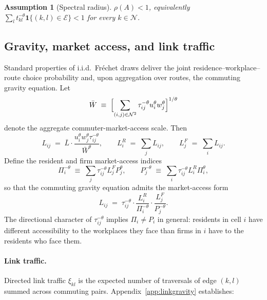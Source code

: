 \documentclass[12pt]{article}
\newtheorem{assumption}{Assumption}
\newcommand{\N}{\mathcal N}
\newcommand{\E}{\mathcal E}
\newcommand{\Lbar}{\bar L}
\newcommand{\Wbar}{\bar W}
\newcommand{\tkl}{t_{kl}}
\newcommand{\tijk}{\tau_{ij}}
\begin{document}
\begin{assumption}[Spectral radius]\label{ass:specrad}
$\rho(A)<1$, equivalently
$\sum_{l}\tkl^{-\theta}\mathbf 1\{(k,l)\in\E\}<1$ for every
$k\in\N$.
\end{assumption}

\subsection{Gravity, market access, and link traffic}\label{ssec:gravity}

Standard properties of i.i.d.\ Fr\'echet draws deliver the joint
residence--workplace--route choice probability and, upon aggregation
over routes, the commuting gravity equation.  Let
\begin{equation}
  \Wbar\;\equiv\;\Bigl[\sum_{(i,j)\in\N^2}\tijk^{-\theta}u_i^{\theta}w_j^{\theta}\Bigr]^{1/\theta}
  \label{eq:Wbar_def}
\end{equation}
denote the aggregate commuter-market-access scale.  Then
\begin{equation}
  L_{ij}\;=\;\Lbar\cdot\frac{u_i^{\theta}w_j^{\theta}\tijk^{-\theta}}{\Wbar^{\theta}},
  \qquad
  L_i^R\;=\;\sum_{j}L_{ij},\qquad L_j^F\;=\;\sum_{i}L_{ij}.
  \label{eq:gravity}
\end{equation}
Define the resident and firm market-access indices
\begin{equation}
  \Pi_i^{-\theta}
  \;\equiv\;\sum_{j}\tijk^{-\theta}L_j^FP_j^{\theta},
  \qquad
  P_j^{-\theta}
  \;\equiv\;\sum_{i}\tijk^{-\theta}L_i^R\Pi_i^{\theta},
  \label{eq:MA_def}
\end{equation}
so that the commuting gravity equation admits the market-access form
\begin{equation}
  L_{ij}\;=\;\tijk^{-\theta}\cdot\frac{L_i^R}{\Pi_i^{-\theta}}\cdot\frac{L_j^F}{P_j^{-\theta}}.
  \label{eq:gravity_MA}
\end{equation}
The directional character of $\tijk^{-\theta}$ implies
$\Pi_i\ne P_i$ in general: residents in cell $i$ have different
accessibility to the workplaces they face than firms in $i$ have to
the residents who face them.

\paragraph{Link traffic.}
Directed link traffic $\xi_{kl}$ is the expected number of traversals
of edge $(k,l)$ summed across commuting pairs.  Appendix~\ref{app:linkgravity}
establishes:
\end{document}
